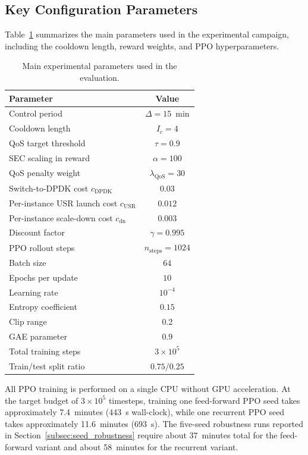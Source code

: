\documentclass[a4paper,fleqn]{cas-sc}
\begin{document}
\subsection{Key Configuration Parameters}

\label{subsec:key_params}

Table~\ref{tab:testbed_params} summarizes the main parameters used in the experimental campaign, including the cooldown length, reward weights, and PPO hyperparameters.

\begin{table}[width=.9\linewidth,cols=2,pos=h]
\centering
\caption{Main experimental parameters used in the evaluation.}
\label{tab:testbed_params}
\begin{tabular}{l c}
\hline
Parameter & Value \\
\hline
Control period & $\Delta = 15$~min \\
Cooldown length & $I_c=4$ \\
QoS target threshold & $\tau=0.9$ \\
SEC scaling in reward & $\alpha=100$ \\
QoS penalty weight & $\lambda_{\mathrm{QoS}}=30$ \\
Switch-to-DPDK cost $c_{\mathrm{DPDK}}$ & $0.03$ \\
Per-instance USR launch cost $c_{\mathrm{USR}}$ & $0.012$ \\
Per-instance scale-down cost $c_{\mathrm{dn}}$ & $0.003$ \\
Discount factor & $\gamma=0.995$ \\
PPO rollout steps & $n_{\mathrm{steps}}=1024$ \\
Batch size & $64$ \\
Epochs per update & $10$ \\
Learning rate & $10^{-4}$ \\
Entropy coefficient & $0.15$ \\
Clip range & $0.2$ \\
GAE parameter & $0.9$ \\
Total training steps & $3\times 10^{5}$ \\
Train/test split ratio & $0.75 / 0.25$ \\
\hline
\end{tabular}
\end{table}

All PPO training is performed on a single CPU without GPU acceleration. At the target budget of $3\times10^5$ timesteps, training one feed-forward PPO seed takes approximately 7.4~minutes (443~s wall-clock), while one recurrent PPO seed takes approximately 11.6~minutes (693~s). The five-seed robustness runs reported in Section~\ref{subsec:seed_robustness} require about 37~minutes total for the feed-forward variant and about 58~minutes for the recurrent variant.
\end{document}
